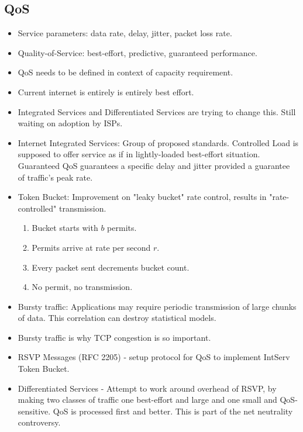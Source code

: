 \documentclass{scrartcl}
\begin{document}
\subsection*{QoS}
\begin{itemize}
\item Service parameters: data rate, delay, jitter, packet loss rate.
\item Quality-of-Service: best-effort, predictive, guaranteed performance.
\item QoS needs to be defined in context of capacity requirement.
\item Current internet is entirely is entirely best effort.
\item Integrated Services and Differentiated Services are trying to
change this. Still waiting on adoption by ISPs.
\item Internet Integrated Services: Group of proposed standards.
Controlled Load is supposed to offer service as if in lightly-loaded
best-effort situation. Guaranteed QoS guarantees a specific delay
and jitter provided a guarantee of traffic's peak rate.
\item Token Bucket: Improvement on "leaky bucket" rate control,
results in "rate-controlled" transmission.
\begin{enumerate}
\item Bucket starts with $b$ permits.
\item Permits arrive at rate per second $r$.
\item Every packet sent decrements bucket count.
\item No permit, no transmission.
\end{enumerate}
\item Bursty traffic: Applications may require periodic transmission
of large chunks of data. This correlation can destroy statistical models.
\item Bursty traffic is why TCP congestion is so important.
\item RSVP Messages (RFC 2205) - setup protocol for QoS to implement
IntServ Token Bucket.
\item Differentiated Services - Attempt to work around overhead of RSVP,
by making two classes of traffic one best-effort and large and one small and
QoS-sensitive. QoS is processed first and better. This is part of the net
neutrality controversy.
\end{itemize}
\end{document}

